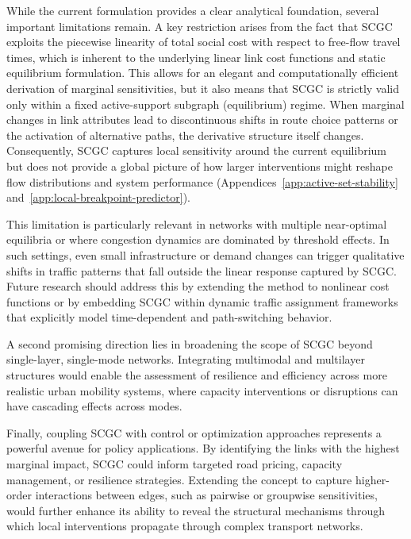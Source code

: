 \documentclass[twocolumn,english,groupedaddress, superscriptaddress,aps,pre,10pt,floatfix]{revtex4-2}
\begin{document}
While the current formulation provides a clear analytical foundation, several important limitations remain. A key restriction arises from the fact that SCGC exploits the piecewise linearity of total social cost with respect to free-flow travel times, which is inherent to the underlying linear link cost functions and static equilibrium formulation. This allows for an elegant and computationally efficient derivation of marginal sensitivities, but it also means that SCGC is strictly valid only within a fixed active-support subgraph (equilibrium) regime. When marginal changes in link attributes lead to discontinuous shifts in route choice patterns or the activation of alternative paths, the derivative structure itself changes. Consequently, SCGC captures local sensitivity around the current equilibrium but does not provide a global picture of how larger interventions might reshape flow distributions and system performance (Appendices~\ref{app:active-set-stability} and~\ref{app:local-breakpoint-predictor}).

This limitation is particularly relevant in networks with multiple near-optimal equilibria or where congestion dynamics are dominated by threshold effects. In such settings, even small infrastructure or demand changes can trigger qualitative shifts in traffic patterns that fall outside the linear response captured by SCGC. Future research should address this by extending the method to nonlinear cost functions or by embedding SCGC within dynamic traffic assignment frameworks that explicitly model time-dependent and path-switching behavior.

A second promising direction lies in broadening the scope of SCGC beyond single-layer, single-mode networks. Integrating multimodal and multilayer structures would enable the assessment of resilience and efficiency across more realistic urban mobility systems, where capacity interventions or disruptions can have cascading effects across modes.

Finally, coupling SCGC with control or optimization approaches represents a powerful avenue for policy applications. By identifying the links with the highest marginal impact, SCGC could inform targeted road pricing, capacity management, or resilience strategies. Extending the concept to capture higher-order interactions between edges, such as pairwise or groupwise sensitivities, would further enhance its ability to reveal the structural mechanisms through which local interventions propagate through complex transport networks.
\end{document}
